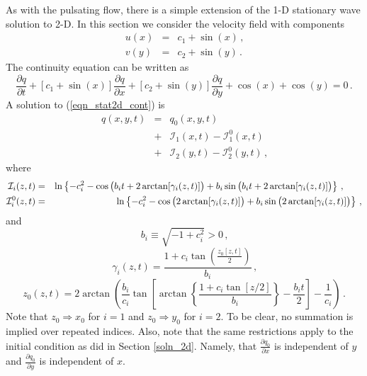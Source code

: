 \documentclass[11pt]{book}
\begin{document}
As with the pulsating flow, there is a simple extension of the 1-D stationary wave solution to 2-D.  In this section we consider the velocity field with components
\begin{eqnarray}
u(x) &=& c_1 + \sin(x) \,\mbox{,} \\
v(y) &=& c_2 + \sin(y) \,\mbox{.}
\end{eqnarray}
The continuity equation can be written as
\begin{equation}
\label{eqn_stat2d_cont}
\frac{\partial q}{\partial t} + [c_1 + \sin(x)] \frac{\partial q}{\partial x} + [c_2 + \sin(y)] \frac{\partial q}{\partial y} + \cos(x) + \cos(y) = 0 \,\mbox{.}
\end{equation}
A solution to (\ref{eqn_stat2d_cont}) is
\begin{eqnarray}
\label{eqn_stat2d_soln}
q(x,y,t) &=& q_0(x,y,t) \nonumber\\
&+& \mathcal{I}_1(x,t) - \mathcal{I}_1^0(x,t) \nonumber\\
&+& \mathcal{I}_2(y,t) - \mathcal{I}_2^0(y,t) \,\mbox{,}
\end{eqnarray}
where
\begin{eqnarray}
\label{eqn_Ii}
\mathcal{I}_i(z,t) &=& \ln\left\{ -c_i^2 - \cos\big(b_i t + 2\arctan[\gamma_i(z,t)] \big) + b_i \sin\big(b_i t + 2\arctan[\gamma_i(z,t)] \big) \right\}\,\mbox{,} \quad\quad  \vspace{0.3cm}\\
\label{eqn_Ii0}
\mathcal{I}_i^0(z,t) &=& \ln\left\{ -c_i^2 - \cos\big(2\arctan[\gamma_i(z,t)] \big) + b_i \sin\big(2\arctan[\gamma_i(z,t)] \big) \right\} \,\mbox{,}
\end{eqnarray}
and
\begin{equation}
b_i \equiv \sqrt{-1 + c_i^2} >0 \,\mbox{,}
\end{equation}
\begin{equation}
\gamma_i(z,t) = \frac{ 1 + c_i \tan\left( \frac{z_0[z,t]}{2} \right) }{b_i} \,\mbox{,}
\end{equation}
\begin{equation}
z_0(z,t) = 2\arctan\left( \frac{b_i}{c_i} \tan \left[ \arctan\left\{ \frac{1+c_i\tan[z/2]}{b_i} \right\} - \frac{b_it}{2} \right] - \frac{1}{c_i} \right) \,\mbox{.}
\end{equation}
Note that $z_0 \Rightarrow x_0$ for $i=1$ and $z_0 \Rightarrow y_0$ for $i=2$.  To be clear, no summation is implied over repeated indices. Also, note that the same restrictions apply to the initial condition as did in Section \ref{soln_2d}. Namely, that $\frac{\partial q_0}{\partial x}$ is independent of $y$ and $\frac{\partial q_0}{\partial y}$ is independent of $x$.
\end{document}

